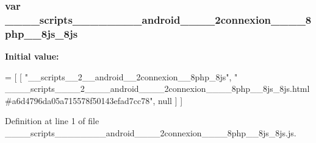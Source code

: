 \subsubsection[{\+\_\+\+\_\+\+\_\+\+\_\+scripts\+\_\+\+\_\+\+\_\+\+\_\+2\+\_\+\+\_\+\+\_\+\+\_\+android\+\_\+\+\_\+\+\_\+\+\_\+2connexion\+\_\+\+\_\+\+\_\+\+\_\+8php\+\_\+\+\_\+8js\+\_\+8js}]{\setlength{\rightskip}{0pt plus 5cm}var \+\_\+\+\_\+\+\_\+\+\_\+scripts\+\_\+\+\_\+\+\_\+\+\_\+\_\+\+\_\+\+\_\+\+\_\+android\+\_\+\+\_\+\+\_\+\+\_\+2connexion\+\_\+\+\_\+\+\_\+\+\_\+8php\+\_\+\+\_\+8js\+\_\+8js}\label{________scripts________2________android________2connexion________8php____8js__8js_8js_a769d985f50881f0ad71545fcba56afff}
{\bfseries Initial value\+:}
\begin{DoxyCode}
=
[
    [ \textcolor{stringliteral}{"\_\_scripts\_\_2\_\_android\_\_2connexion\_\_8php\_8js"}, \textcolor{stringliteral}{"
      \_\_\_\_scripts\_\_\_\_2\_\_\_\_android\_\_\_\_2connexion\_\_\_\_8php\_\_8js\_8js.html#a6d4796da05a715578f50143efad7cc78"}, null ]
]
\end{DoxyCode}


Definition at line 1 of file \+\_\+\+\_\+\+\_\+\+\_\+scripts\+\_\+\+\_\+\+\_\+\+\_\+\_\+\+\_\+\+\_\+\+\_\+android\+\_\+\+\_\+\+\_\+\+\_\+2connexion\+\_\+\+\_\+\+\_\+\+\_\+8php\+\_\+\+\_\+8js\+\_\+8js.\+js.


